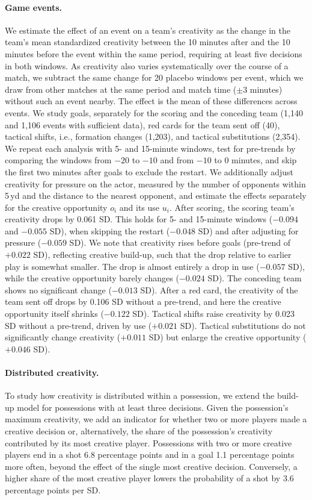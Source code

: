 \paragraph{Game events.} We estimate the effect of an event on a team's creativity as the change in the team's mean
standardized creativity between the 10 minutes after and the 10 minutes before the event within the same period,
requiring at least five decisions in both windows. As creativity also varies systematically over the course of a
match, we subtract the same change for 20 placebo windows per event, which we draw from other matches at the same
period and match time ($\pm$3 minutes) without such an event nearby. The effect is the mean of these differences
across events. We study goals, separately for the scoring and the conceding team (1,140 and 1,106 events with
sufficient data), red cards for the team sent off (40), tactical shifts, i.e., formation changes (1,203), and tactical
substitutions (2,354). We repeat each analysis with 5- and 15-minute windows, test for pre-trends by comparing the
windows from $-20$ to $-10$ and from $-10$ to 0 minutes, and skip the first two minutes after goals to exclude the
restart. We additionally adjust creativity for pressure on the actor, measured by the number of opponents within
5\,yd and the distance to the nearest opponent, and estimate the effects separately for the creative opportunity $o_i$
and its use $u_i$. After scoring, the scoring team's creativity drops by 0.061 SD. This holds for 5- and 15-minute
windows ($-0.094$ and $-0.055$ SD), when skipping the restart ($-0.048$ SD) and after adjusting for pressure
($-0.059$ SD). We note that creativity rises before goals (pre-trend of $+0.022$ SD), reflecting creative build-up,
such that the drop relative to earlier play is somewhat smaller. The drop is almost entirely a drop in use
($-0.057$ SD), while the creative opportunity barely changes ($-0.024$ SD). The conceding team shows no significant
change ($-0.013$ SD). After a red card, the creativity of the team sent off drops by 0.106 SD without a pre-trend, and
here the creative opportunity itself shrinks ($-0.122$ SD). Tactical shifts raise creativity by 0.023 SD without a
pre-trend, driven by use ($+0.021$ SD). Tactical substitutions do not significantly change creativity ($+0.011$ SD)
but enlarge the creative opportunity ($+0.046$ SD).

\paragraph{Distributed creativity.} To study how creativity is distributed within a possession, we extend the build-up
model for possessions with at least three decisions. Given the possession's maximum creativity, we add an indicator
for whether two or more players made a creative decision or, alternatively, the share of the possession's creativity
contributed by its most creative player. Possessions with two or more creative players end in a shot 6.8 percentage
points and in a goal 1.1 percentage points more often, beyond the effect of the single most creative decision.
Conversely, a higher share of the most creative player lowers the probability of a shot by 3.6 percentage points per
SD.

